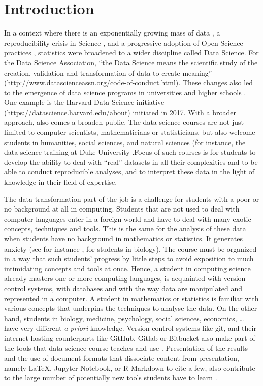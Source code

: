 \documentclass{aims}
\theoremstyle{definition}
\begin{document}
\hypertarget{introduction}{%
\section{Introduction}\label{introduction}}

In a context where there is an exponentially growing mass of data
\cite{Marx2013}, a reproducibility crisis in Science \cite{Baker2016},
and a progressive adoption of Open Science practices \cite{Banks2019},
statistics were broadened to a wider discipline called Data Science. For
the Data Science Association, ``the Data Science means the scientific
study of the creation, validation and transformation of data to create
meaning'' (\url{http://www.datascienceassn.org/code-of-conduct.html}).
These changes also led to the emergence of data science programs in
universities and higher schools \cite{Donoho2017, Cetinkaya-Rundel2021}.
One example is the Harvard Data Science initiative
(\url{https://datascience.harvard.edu/about}) initiated in 2017. With a
broader approach, also comes a broaden public. The data science courses
are not just limited to computer scientists, mathematicians or
statisticians, but also welcome students in humanities, social sciences,
and natural sciences (for instance, the data science training at Duke
University \cite{Cetinkaya-Rundel2021}.Focus of such courses is for
students to develop the ability to deal with ``real'' datasets in all
their complexities and to be able to conduct reproducible analyses, and
to interpret these data in the light of knowledge in their field of
expertise.

The data transformation part of the job is a challenge for students with
a poor or no background at all in computing. Students that are not used
to deal with computer languages enter in a foreign world and have to
deal with many exotic concepts, techniques and tools. This is the same
for the analysis of these data when students have no background in
mathematics or statistics. It generates anxiety (see for instance
\cite{Onwuegbuzie2003}, for students in biology). The course must be
organized in a way that such students' progress by little steps to avoid
exposition to much intimidating concepts and tools at once. Hence, a
student in computing science already masters one or more computing
languages, is acquainted with version control systems, with databases
and with the way data are manipulated and represented in a computer. A
student in mathematics or statistics is familiar with various concepts
that underpins the techniques to analyse the data. On the other hand,
students in biology, medicine, psychology, social sciences, economics,
\ldots{} have very different \emph{a priori} knowledge. Version control
systems like git, and their internet hosting counterparts like GitHub,
Gitlab or Bitbucket also make part of the tools that data science course
teaches and use \cite{Fiksel2019, Hsing2019}. Presentation of the
results and the use of document formats that dissociate content from
presentation, namely LaTeX, Jupyter Notebook, or R Markdown to cite a
few, also contribute to the large number of potentially new tools
students have to learn \cite{Baumer2014}.
\end{document}
